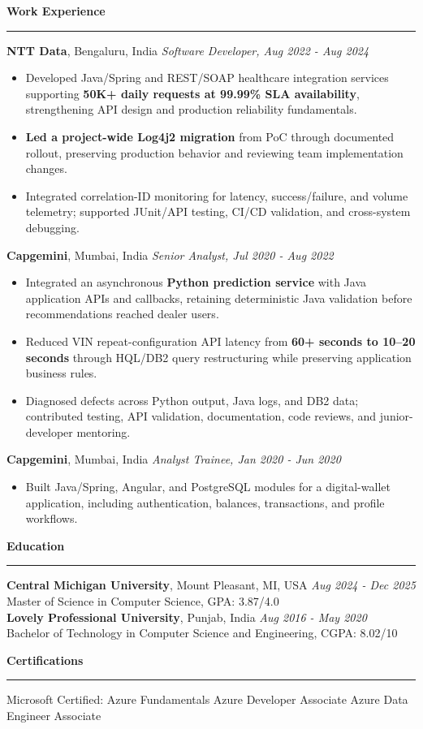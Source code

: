 \documentclass[11pt,letterpaper]{article}
\newcommand{\ressection}[1]{\Needspace{6\baselineskip}\vspace{8pt}\par\textbf{#1}\par\vspace{2pt}\hrule\vspace{5pt}}
\begin{document}
\ressection{Work Experience}
\textbf{NTT Data}, Bengaluru, India \hfill \textit{Software Developer, Aug 2022 - Aug 2024}
\begin{itemize}
  \item Developed Java/Spring and REST/SOAP healthcare integration services supporting \textbf{50K+ daily requests at 99.99\% SLA availability}, strengthening API design and production reliability fundamentals.
  \item \textbf{Led a project-wide Log4j2 migration} from PoC through documented rollout, preserving production behavior and reviewing team implementation changes.
  \item Integrated correlation-ID monitoring for latency, success/failure, and volume telemetry; supported JUnit/API testing, CI/CD validation, and cross-system debugging.
\end{itemize}
\textbf{Capgemini}, Mumbai, India \hfill \textit{Senior Analyst, Jul 2020 - Aug 2022}
\begin{itemize}
  \item Integrated an asynchronous \textbf{Python prediction service} with Java application APIs and callbacks, retaining deterministic Java validation before recommendations reached dealer users.
  \item Reduced VIN repeat-configuration API latency from \textbf{60+ seconds to 10--20 seconds} through HQL/DB2 query restructuring while preserving application business rules.
  \item Diagnosed defects across Python output, Java logs, and DB2 data; contributed testing, API validation, documentation, code reviews, and junior-developer mentoring.
\end{itemize}
\textbf{Capgemini}, Mumbai, India \hfill \textit{Analyst Trainee, Jan 2020 - Jun 2020}
\begin{itemize}
  \item Built Java/Spring, Angular, and PostgreSQL modules for a digital-wallet application, including authentication, balances, transactions, and profile workflows.
\end{itemize}

\ressection{Education}
\textbf{Central Michigan University}, Mount Pleasant, MI, USA \hfill \textit{Aug 2024 - Dec 2025}\\
Master of Science in Computer Science, GPA: 3.87/4.0\\[2pt]
\textbf{Lovely Professional University}, Punjab, India \hfill \textit{Aug 2016 - May 2020}\\
Bachelor of Technology in Computer Science and Engineering, CGPA: 8.02/10

\ressection{Certifications}
Microsoft Certified: Azure Fundamentals \textbar{} Azure Developer Associate \textbar{} Azure Data Engineer Associate
\end{document}

